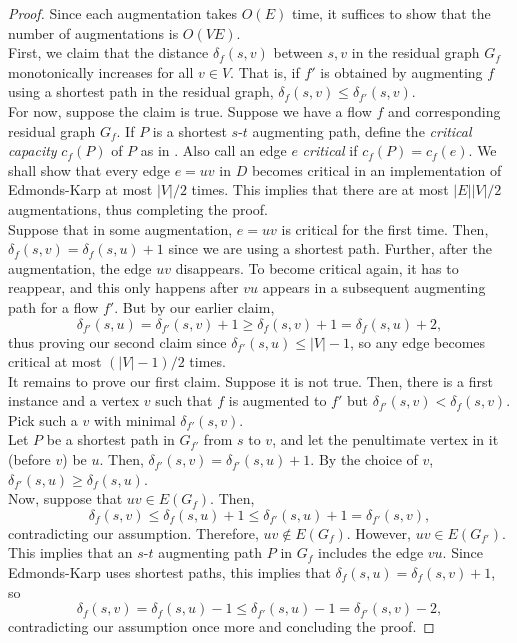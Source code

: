			\begin{proof}
				Since each augmentation takes $O(E)$ time, it suffices to show that the number of augmentations is $O(VE)$.\\
				First, we claim that the distance $\delta_f(s,v)$ between $s,v$ in the residual graph $G_f$ monotonically increases for all $v\in V$. That is, if $f'$ is obtained by augmenting $f$ using a shortest path in the residual graph, $\delta_f(s,v) \le \delta_{f'}(s,v)$.\\
				For now, suppose the claim is true. Suppose we have a flow $f$ and corresponding residual graph $G_f$. If $P$ is a shortest $s$-$t$ augmenting path, define the \emph{critical capacity} $c_f(P)$ of $P$ as in . Also call an edge $e$ \emph{critical} if $c_f(P) = c_f(e)$. We shall show that every edge $e = uv$ in $D$ becomes critical in an implementation of Edmonds-Karp at most $|V|/2$ times. This implies that there are at most $|E||V|/2$ augmentations, thus completing the proof.\\
				Suppose that in some augmentation, $e = uv$ is critical for the first time. Then, $\delta_f(s,v) = \delta_f(s,u) + 1$ since we are using a shortest path. Further, after the augmentation, the edge $uv$ disappears. To become critical again, it has to reappear, and this only happens after $vu$ appears in a subsequent augmenting path for a flow $f'$. But by our earlier claim,
				\[ \delta_{f'}(s,u) = \delta_{f'}(s,v) + 1 \ge \delta_f(s,v) + 1 = \delta_f(s,u) + 2, \]
				thus proving our second claim since $\delta_{f'}(s,u) \le |V|-1$, so any edge becomes critical at most $(|V|-1)/2$ times.\\

				It remains to prove our first claim. Suppose it is not true. Then, there is a first instance and a vertex $v$ such that $f$ is augmented to $f'$ but $\delta_{f'}(s,v) < \delta_{f}(s,v)$. Pick such a $v$ with minimal $\delta_{f'}(s,v)$.\\
				Let $P$ be a shortest path in $G_{f'}$ from $s$ to $v$, and let the penultimate vertex in it (before $v$) be $u$. Then, $\delta_{f'}(s,v) = \delta_{f'}(s,u) + 1$. By the choice of $v$, $\delta_{f'}(s,u) \ge \delta_{f}(s,u)$.\\
				Now, suppose that $uv \in E(G_f)$. Then,
				\[ \delta_f(s,v) \le \delta_f(s,u) + 1 \le \delta_{f'}(s,u) + 1 = \delta_{f'}(s,v), \]
				contradicting our assumption. Therefore, $uv \not\in E(G_f)$. However, $uv \in E(G_{f'})$. This implies that an $s$-$t$ augmenting path $P$ in $G_f$ includes the edge $vu$. Since Edmonds-Karp uses shortest paths, this implies that $\delta_f(s,u) = \delta_f(s,v) + 1$, so
				\[ \delta_f(s,v) = \delta_f(s,u) - 1 \le \delta_{f'}(s,u) - 1 = \delta_{f'}(s,v) - 2, \]
				contradicting our assumption once more and concluding the proof. 
			\end{proof}


